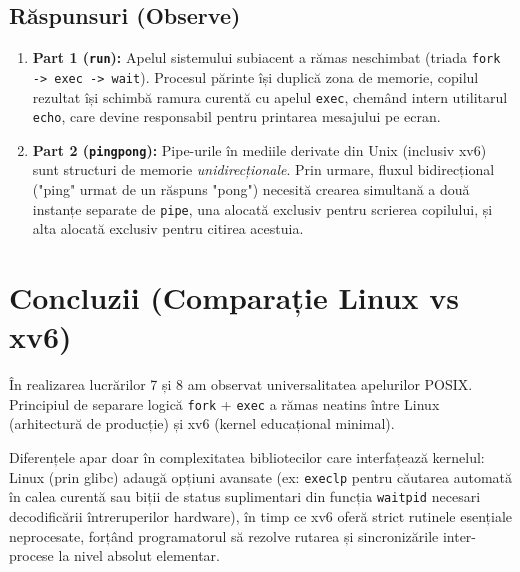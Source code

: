 \documentclass[12pt,a4paper]{article}
\begin{document}
\subsection{Răspunsuri (Observe)}
\begin{enumerate}
    \item \textbf{Part 1 (\texttt{run}):} Apelul sistemului subiacent a rămas neschimbat (triada \texttt{fork -> exec -> wait}). Procesul părinte își duplică zona de memorie, copilul rezultat își schimbă ramura curentă cu apelul \texttt{exec}, chemând intern utilitarul \texttt{echo}, care devine responsabil pentru printarea mesajului pe ecran.
    \item \textbf{Part 2 (\texttt{pingpong}):} Pipe-urile în mediile derivate din Unix (inclusiv xv6) sunt structuri de memorie \textit{unidirecționale}. Prin urmare, fluxul bidirecțional ("ping" urmat de un răspuns "pong") necesită crearea simultană a două instanțe separate de \texttt{pipe}, una alocată exclusiv pentru scrierea copilului, și alta alocată exclusiv pentru citirea acestuia.
\end{enumerate}

\section{Concluzii (Comparație Linux vs xv6)}
În realizarea lucrărilor 7 și 8 am observat universalitatea apelurilor POSIX. Principiul de separare logică \texttt{fork} + \texttt{exec} a rămas neatins între Linux (arhitectură de producție) și xv6 (kernel educațional minimal). 

Diferențele apar doar în complexitatea bibliotecilor care interfațează kernelul: Linux (prin glibc) adaugă opțiuni avansate (ex: \texttt{execlp} pentru căutarea automată în calea curentă sau biții de status suplimentari din funcția \texttt{waitpid} necesari decodificării întreruperilor hardware), în timp ce xv6 oferă strict rutinele esențiale neprocesate, forțând programatorul să rezolve rutarea și sincronizările inter-procese la nivel absolut elementar.
\end{document}
